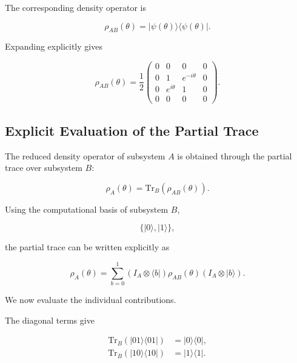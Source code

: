 The corresponding density operator is

\begin{equation}
\rho_{AB}(\theta)
=
|\psi(\theta)\rangle
\langle\psi(\theta)|.
\label{eq:appendix_phase_density_operator}
\end{equation}

Expanding explicitly gives

\begin{equation}
\rho_{AB}(\theta)
=
\frac{1}{2}
\begin{pmatrix}
0 & 0 & 0 & 0 \\
0 & 1 & e^{-i\theta} & 0 \\
0 & e^{i\theta} & 1 & 0 \\
0 & 0 & 0 & 0
\end{pmatrix}.
\label{eq:appendix_phase_density_matrix}
\end{equation}


\subsection*{Explicit Evaluation of the Partial Trace}

The reduced density operator of subsystem \( A \) is obtained through the partial trace over subsystem \( B \):

\begin{equation}
\rho_A(\theta)
=
\mathrm{Tr}_B
\left(
\rho_{AB}(\theta)
\right).
\label{eq:appendix_partial_trace_definition}
\end{equation}

Using the computational basis of subsystem \( B \),

\[
\{
|0\rangle,
|1\rangle
\},
\]

the partial trace can be written explicitly as

\begin{equation}
\rho_A(\theta)
=
\sum_{b=0}^{1}
\left(
I_A \otimes \langle b|
\right)
\rho_{AB}(\theta)
\left(
I_A \otimes |b\rangle
\right).
\label{eq:appendix_partial_trace_explicit}
\end{equation}

We now evaluate the individual contributions.

\medskip

The diagonal terms give

\begin{align}
\mathrm{Tr}_B
\left(
|01\rangle\langle 01|
\right)
&=
|0\rangle\langle 0|,
\nonumber
\\
\mathrm{Tr}_B
\left(
|10\rangle\langle 10|
\right)
&=
|1\rangle\langle 1|.
\label{eq:appendix_partial_trace_diagonal}
\end{align}


